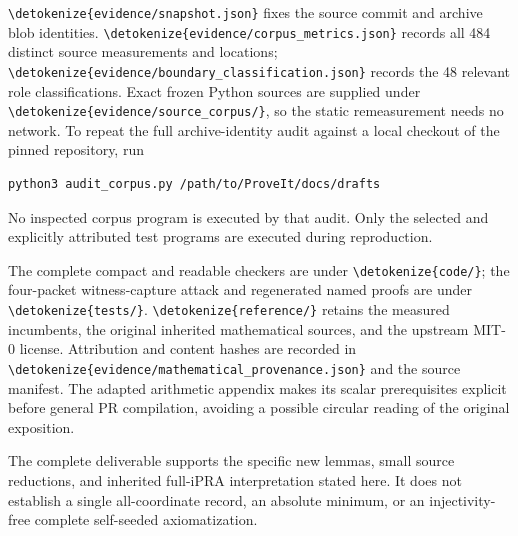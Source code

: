 \documentclass[11pt]{article}
\theoremstyle{definition}\newtheorem{definition}[theorem]{Definition}
\newcommand{\file}[1]{\expandafter\nolinkurl\expandafter{\detokenize{#1}}}
\begin{document}
\file{evidence/snapshot.json} fixes the source commit and archive blob
identities. \file{evidence/corpus_metrics.json} records all 484 distinct
source measurements and locations; \file{evidence/boundary_classification.json}
records the 48 relevant role classifications. Exact frozen Python
sources are supplied under \file{evidence/source_corpus/}, so the static
remeasurement needs no network. To repeat the full archive-identity audit
against a local checkout of the pinned repository, run
\begin{verbatim}
python3 audit_corpus.py /path/to/ProveIt/docs/drafts
\end{verbatim}
No inspected corpus program is executed by that audit. Only the selected
and explicitly attributed test programs are executed during reproduction.

The complete compact and readable checkers are under \file{code/};
the four-packet witness-capture attack and regenerated named proofs are
under \file{tests/}. \file{reference/} retains the measured incumbents,
the original inherited mathematical sources, and the upstream MIT-0
license. Attribution and content hashes are recorded in
\file{evidence/mathematical_provenance.json} and the source manifest.
The adapted arithmetic appendix makes its scalar prerequisites explicit
before general PR compilation, avoiding a possible circular reading of
the original exposition.

The complete deliverable supports the specific new lemmas, small source
reductions, and inherited full-iPRA interpretation stated here. It does
not establish a single all-coordinate record, an absolute minimum,
or an injectivity-free complete self-seeded axiomatization.
\end{document}
